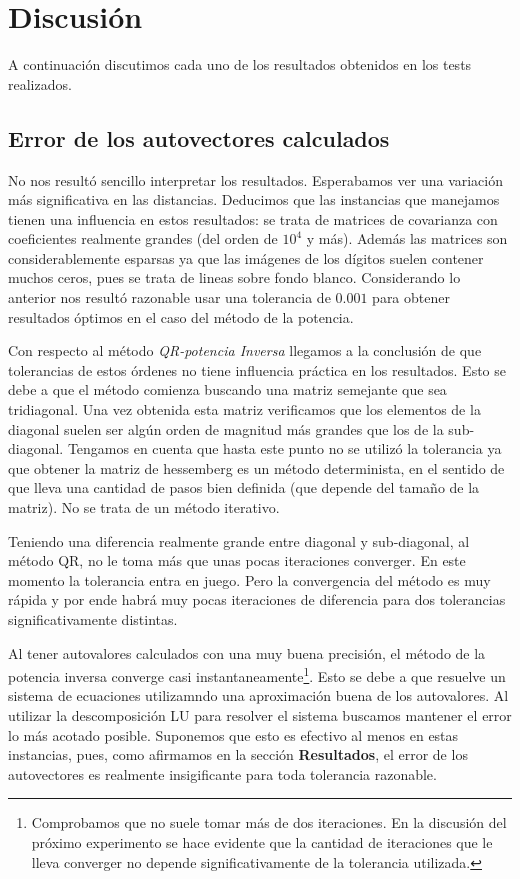 \section{Discusi\'on}

	\PARstart A continuaci\'on discutimos cada uno de los resultados obtenidos en los tests
	realizados.

	\subsection{Error de los autovectores calculados}

		No nos result\'o sencillo interpretar los resultados. Esperabamos ver una
		variaci\'on m\'as significativa en las distancias. Deducimos que las instancias
		que manejamos tienen una influencia en estos resultados:
		se trata de matrices de covarianza con coeficientes realmente grandes (del orden
		de $10^4$ y m\'as). Adem\'as las matrices son considerablemente esparsas ya que
		las im\'agenes de los d\'igitos suelen contener muchos ceros, pues se trata de
		lineas sobre fondo blanco.
		Considerando lo anterior nos result\'o razonable usar una tolerancia de $0.001$
		para obtener resultados \'optimos en el caso del m\'etodo de la potencia.

		Con respecto al m\'etodo \textit{QR-potencia Inversa} llegamos a la conclusi\'on
		de que tolerancias de estos \'ordenes no tiene influencia pr\'actica en los resultados.
		Esto se debe a que el m\'etodo comienza buscando una matriz semejante que sea
		tridiagonal. Una vez obtenida esta matriz verificamos que los elementos de la diagonal
		suelen ser alg\'un orden de magnitud m\'as grandes que los de la sub-diagonal.
		Tengamos en cuenta que hasta este punto no se utiliz\'o la tolerancia ya que
		obtener la matriz de hessemberg es un m\'etodo determinista, en el sentido de que
		lleva una cantidad de pasos bien definida (que depende del tama\~no de la matriz).
		No se trata de un m\'etodo iterativo.

		Teniendo una diferencia realmente grande entre diagonal y sub-diagonal, al m\'etodo QR,
		no le toma m\'as que unas pocas iteraciones converger. En este momento la tolerancia
		entra en juego. Pero la convergencia del m\'etodo es muy r\'apida y por ende habr\'a
		muy pocas iteraciones de diferencia para dos tolerancias significativamente distintas.

		Al tener autovalores calculados con una muy buena precisi\'on, el m\'etodo de la
		potencia inversa converge casi instantaneamente\footnote{Comprobamos que no suele tomar
		m\'as de dos iteraciones. En la discusi\'on del pr\'oximo experimento se hace evidente
		que la cantidad de iteraciones que le lleva converger no depende significativamente
		de la tolerancia utilizada.}. Esto se debe a que resuelve un sistema de ecuaciones
		utilizamndo una aproximaci\'on buena de los autovalores. Al utilizar la descomposici\'on
		LU para resolver el sistema buscamos mantener el error lo m\'as acotado posible.
		Suponemos que esto es efectivo al menos en estas instancias, pues, como afirmamos
		en la secci\'on \textbf{Resultados}, el error de los autovectores es realmente
		insigificante para toda tolerancia razonable.
		
